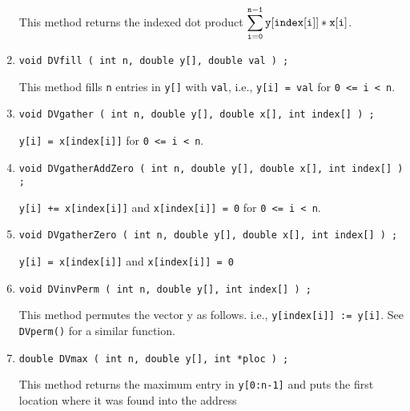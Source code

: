 \begin{enumerate}
This method returns the indexed dot product 
$\displaystyle \sum_{{\tt i=0}}^{{\tt n-1}} {\tt y[index[i]] * x[i]}$.
\item
\begin{verbatim}
void DVfill ( int n, double y[], double val ) ;
\end{verbatim}
This method fills {\tt n} entries in {\tt y[]} with {\tt val}, 
i.e.,
{\tt y[i] = val} for {\tt 0 <= i < n}.
\item
\begin{verbatim}
void DVgather ( int n, double y[], double x[], int index[] ) ;
\end{verbatim}
{\tt y[i] = x[index[i]]} for {\tt 0 <= i < n}.
\item
\begin{verbatim}
void DVgatherAddZero ( int n, double y[], double x[], int index[] ) ;
\end{verbatim}
{\tt y[i] += x[index[i]]} and
{\tt x[index[i]] = 0} 
for {\tt 0 <= i < n}.
\item
\begin{verbatim}
void DVgatherZero ( int n, double y[], double x[], int index[] ) ;
\end{verbatim}
{\tt y[i] = x[index[i]]} and
{\tt x[index[i]] = 0} 
\item
\begin{verbatim}
void DVinvPerm ( int n, double y[], int index[] ) ;
\end{verbatim}
This method permutes the vector y as follows.
i.e.,
{\tt y[index[i]] := y[i]}.
See {\tt DVperm()} for a similar function.
\item
\begin{verbatim}
double DVmax ( int n, double y[], int *ploc ) ;
\end{verbatim}
This method returns the maximum entry in {\tt y[0:n-1]}
and puts the first location where it was found into the address

\end{enumerate}

